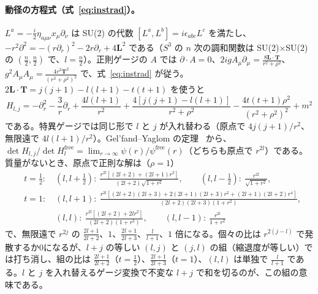 \documentclass[a4paper,10pt]{ltjsarticle}
\begin{document}
\paragraph{動径の方程式（式~\eqref{eq:instrad}）。}$L^a=-\frac i2\eta_{a\mu\nu}x_\mu\partial_\nu$ は SU(2) の代数 $[L^a,L^b]=i\epsilon_{abc}L^c$ を満たし、$-r^2\partial^2=-(r\partial_r)^2-2r\partial_r+4\boldsymbol L^2$ である（$S^3$ の $n$ 次の調和関数は SU(2)$\times$SU(2) の $(\frac n2,\frac n2)$ で、$l=\frac n2$）。正則ゲージの $A$ では $\partial\cdot A=0$、$2igA_\mu\partial_\mu=\frac{8\boldsymbol L\cdot\boldsymbol T}{r^2+\rho^2}$、$g^2A_\mu A_\mu=\frac{4r^2\boldsymbol T^2}{(r^2+\rho^2)^2}$ で、式~\eqref{eq:instrad} が従う。$2\boldsymbol L\cdot\boldsymbol T=j(j+1)-l(l+1)-t(t+1)$ を使うと
\begin{equation*}
H_{l,j}=-\partial_r^2-\frac3r\partial_r+\frac{4l(l+1)}{r^2}+\frac{4[j(j+1)-l(l+1)]}{r^2+\rho^2}-\frac{4t(t+1)\rho^2}{(r^2+\rho^2)^2}+m^2
\end{equation*}
である。特異ゲージでは同じ形で $l$ と $j$ が入れ替わる（原点で $4j(j+1)/r^2$、無限遠で $4l(l+1)/r^2$）。Gel'fand--Yaglom の定理~\cite{gy60} から、$\det H_{l,j}/\det H^{\mathrm{free}}_l=\lim_{r\to\infty}\psi(r)/\psi^{\mathrm{free}}(r)$（どちらも原点で $r^{2l}$）である。質量がないとき、原点で正則な解は（$\rho=1$）
\begin{equation*}
\begin{aligned}
&t=\tfrac12:\quad (l,l+\tfrac12):\ \frac{r^{2l}[(2l+2)+(2l+1)r^2]}{(2l+2)\sqrt{1+r^2}},\qquad (l,l-\tfrac12):\ \frac{r^{2l}}{\sqrt{1+r^2}},\\
&t=1:\quad (l,l+1):\ \frac{r^{2l}[(2l+2)(2l+3)+2(2l+1)(2l+3)r^2+(2l+1)(2l+2)r^4]}{(2l+2)(2l+3)(1+r^2)},\\
&\phantom{t=1:}\quad (l,l):\ \frac{r^{2l}[(2l+2)+2lr^2]}{(2l+2)(1+r^2)},\qquad (l,l-1):\ \frac{r^{2l}}{1+r^2}
\end{aligned}
\end{equation*}
で、無限遠で $r^{2j}$ の $\frac{2l+1}{2l+2}$、$1$、$\frac{2l+1}{2l+3}$、$\frac l{l+1}$、$1$ 倍になる。個々の比は $r^{2(j-l)}$ で発散するか0になるが、$l+j$ の等しい $(l,j)$ と $(j,l)$ の組（縮退度が等しい）では打ち消し、組の比は $\frac{2l+1}{2l+2}$（$t=\frac12$）、$\frac{2l+1}{2l+3}$（$t=1$）、$(l,l)$ は単独で $\frac l{l+1}$ である。$l$ と $j$ を入れ替えるゲージ変換で不変な $l+j$ で和を切るのが、この組の意味である。
\end{document}
